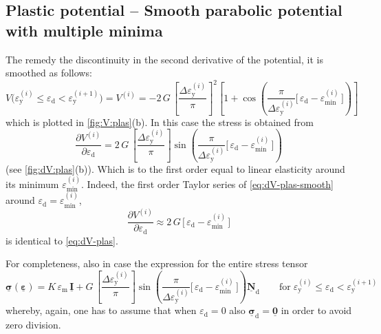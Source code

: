 \documentclass[fleqn]{goose-article}
\newcommand\T[1]{\underline{\bm{{#1}}}}
\begin{document}
\subsection{Plastic potential -- Smooth parabolic potential with multiple minima}

The remedy the discontinuity in the second derivative of the potential, it is smoothed as follows:
\begin{equation}
    \label{eq:V-plas-smooth}
    V \big(
        \varepsilon_\mathrm{y}^{(i)} \leq \varepsilon_\mathrm{d} < \varepsilon_\mathrm{y}^{(i+1)}
    \big)
    =
    V^{(i)}
    =
    - 2 \, G \,
    \left[ \frac{\Delta \varepsilon_\mathrm{y}^{(i)}}{\pi} \right]^2
    \left[
        1 + \cos \left(
          \frac{ \pi }{ \Delta \varepsilon_\mathrm{y}^{(i)} }
          \Big[\, \varepsilon_\mathrm{d} - \varepsilon_\mathrm{min}^{(i)} \,\Big]
        \right)
    \right]
\end{equation}
which is plotted in \cref{fig:V:plas}(b).
In this case the stress is obtained from
\begin{equation}
    \label{eq:dV-plas-smooth}
    \frac{\partial V^{(i)}}{\partial \varepsilon_\mathrm{d}}
    =
    2 \, G \,
    \left[ \frac{\Delta \varepsilon_\mathrm{y}^{(i)}}{\pi} \right]
    \sin \left(
        \frac{ \pi }{ \Delta \varepsilon_\mathrm{y}^{(i)} }
        \Big[\, \varepsilon_\mathrm{d} - \varepsilon_\mathrm{min}^{(i)} \,\Big]
    \right)
\end{equation}
(see \cref{fig:dV:plas}(b)).
Which is to the first order equal to linear elasticity around its minimum
$\varepsilon_\mathrm{min}^{(i)}$.
Indeed, the first order Taylor series of \cref{eq:dV-plas-smooth} around
$\varepsilon_\mathrm{d} = \varepsilon_\mathrm{min}^{(i)}$,
\begin{equation}
    \frac{\partial V^{(i)}}{\partial \varepsilon_\mathrm{d}}
    \approx
    2 \, G \, \Big[\, \varepsilon_\mathrm{d} - \varepsilon_\mathrm{min}^{(i)} \,\Big]
\end{equation}
is identical to \cref{eq:dV-plas}.

For completeness, also in case the expression for the entire stress tensor
\begin{equation}
    \T{\sigma} ( \T{\varepsilon} )
    =
    K \, \varepsilon_\mathrm{m} \, \T{I}
    +
    G \,
    \left[ \frac{\Delta \varepsilon_\mathrm{y}^{(i)}}{\pi} \right]
    \sin \left(
        \frac{ \pi }{ \Delta \varepsilon_\mathrm{y}^{(i)} }
        \Big[\, \varepsilon_\mathrm{d} - \varepsilon_\mathrm{min}^{(i)} \,\Big]
    \right)
    \T{N}_\mathrm{d}
    \qquad
    \mathrm{for}
    \;
    \varepsilon_\mathrm{y}^{(i)} \leq \varepsilon_\mathrm{d} < \varepsilon_\mathrm{y}^{(i+1)}
\end{equation}
whereby, again, one has to assume that when $\varepsilon_\mathrm{d} = 0$ also
$\T{\sigma}_\mathrm{d} = \T{0}$ in order to avoid zero division.
\end{document}
